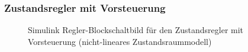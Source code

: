 \subsubsection{Zustandsregler mit Vorsteuerung}

\begin{figure}[H]
    \centering
    \caption[Regler mit Vorsteuerung Simulink (nicht-linear)]{Simulink Regler-Blockschaltbild für den Zustandsregler mit Vorsteuerung (nicht-lineares Zustandsraummodell)}
    \label{fig:Bild32}
\end{figure}

